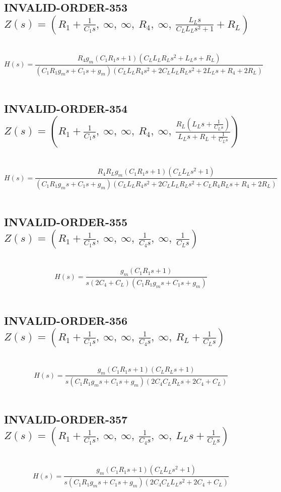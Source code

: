 \documentclass{article}
\begin{document}
\subsection{INVALID-ORDER-353 $Z(s) = \left( R_{1} + \frac{1}{C_{1} s}, \  \infty, \  \infty, \  R_{4}, \  \infty, \  \frac{L_{L} s}{C_{L} L_{L} s^{2} + 1} + R_{L}\right)$ } \ 
\textbf{\[H(s) = \frac{R_{4} g_{m} \left(C_{1} R_{1} s + 1\right) \left(C_{L} L_{L} R_{L} s^{2} + L_{L} s + R_{L}\right)}{\left(C_{1} R_{1} g_{m} s + C_{1} s + g_{m}\right) \left(C_{L} L_{L} R_{4} s^{2} + 2 C_{L} L_{L} R_{L} s^{2} + 2 L_{L} s + R_{4} + 2 R_{L}\right)}\] } \ 
\subsection{INVALID-ORDER-354 $Z(s) = \left( R_{1} + \frac{1}{C_{1} s}, \  \infty, \  \infty, \  R_{4}, \  \infty, \  \frac{R_{L} \left(L_{L} s + \frac{1}{C_{L} s}\right)}{L_{L} s + R_{L} + \frac{1}{C_{L} s}}\right)$ } \ 
\textbf{\[H(s) = \frac{R_{4} R_{L} g_{m} \left(C_{1} R_{1} s + 1\right) \left(C_{L} L_{L} s^{2} + 1\right)}{\left(C_{1} R_{1} g_{m} s + C_{1} s + g_{m}\right) \left(C_{L} L_{L} R_{4} s^{2} + 2 C_{L} L_{L} R_{L} s^{2} + C_{L} R_{4} R_{L} s + R_{4} + 2 R_{L}\right)}\] } \ 
\subsection{INVALID-ORDER-355 $Z(s) = \left( R_{1} + \frac{1}{C_{1} s}, \  \infty, \  \infty, \  \frac{1}{C_{4} s}, \  \infty, \  \frac{1}{C_{L} s}\right)$ } \ 
\textbf{\[H(s) = \frac{g_{m} \left(C_{1} R_{1} s + 1\right)}{s \left(2 C_{4} + C_{L}\right) \left(C_{1} R_{1} g_{m} s + C_{1} s + g_{m}\right)}\] } \ 
\subsection{INVALID-ORDER-356 $Z(s) = \left( R_{1} + \frac{1}{C_{1} s}, \  \infty, \  \infty, \  \frac{1}{C_{4} s}, \  \infty, \  R_{L} + \frac{1}{C_{L} s}\right)$ } \ 
\textbf{\[H(s) = \frac{g_{m} \left(C_{1} R_{1} s + 1\right) \left(C_{L} R_{L} s + 1\right)}{s \left(C_{1} R_{1} g_{m} s + C_{1} s + g_{m}\right) \left(2 C_{4} C_{L} R_{L} s + 2 C_{4} + C_{L}\right)}\] } \ 
\subsection{INVALID-ORDER-357 $Z(s) = \left( R_{1} + \frac{1}{C_{1} s}, \  \infty, \  \infty, \  \frac{1}{C_{4} s}, \  \infty, \  L_{L} s + \frac{1}{C_{L} s}\right)$ } \ 
\textbf{\[H(s) = \frac{g_{m} \left(C_{1} R_{1} s + 1\right) \left(C_{L} L_{L} s^{2} + 1\right)}{s \left(C_{1} R_{1} g_{m} s + C_{1} s + g_{m}\right) \left(2 C_{4} C_{L} L_{L} s^{2} + 2 C_{4} + C_{L}\right)}\] } \ 
\end{document}
